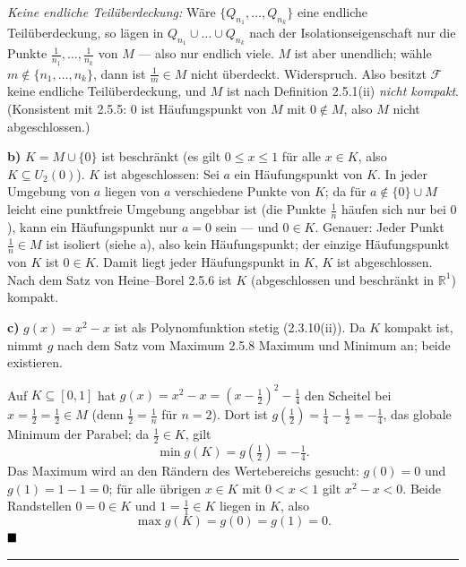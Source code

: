 \documentclass[a4paper,11pt]{article}
\providecommand{\qed}{\hfill\ensuremath{\blacksquare}}
\begin{document}
\emph{Keine endliche Teilüberdeckung:} Wäre $\{Q_{n_1},\dots,Q_{n_k}\}$ eine endliche Teilüberdeckung, so lägen in $Q_{n_1}\cup\dots\cup Q_{n_k}$ nach der Isolationseigenschaft nur die Punkte $\tfrac1{n_1},\dots,\tfrac1{n_k}$ von $M$ — also nur endlich viele. $M$ ist aber unendlich; wähle $m\notin\{n_1,\dots,n_k\}$, dann ist $\tfrac1m\in M$ nicht überdeckt. Widerspruch. Also besitzt $\mathcal F$ keine endliche Teilüberdeckung, und $M$ ist nach Definition 2.5.1(ii) \emph{nicht kompakt}. (Konsistent mit 2.5.5: $0$ ist Häufungspunkt von $M$ mit $0\notin M$, also $M$ nicht abgeschlossen.)

\textbf{b)} $K=M\cup\{0\}$ ist beschränkt (es gilt $0\le x\le 1$ für alle $x\in K$, also $K\subseteq U_2(0)$). $K$ ist abgeschlossen: Sei $a$ ein Häufungspunkt von $K$. In jeder Umgebung von $a$ liegen von $a$ verschiedene Punkte von $K$; da für $a\notin\{0\}\cup M$ leicht eine punktfreie Umgebung angebbar ist (die Punkte $\tfrac1n$ häufen sich nur bei $0$), kann ein Häufungspunkt nur $a=0$ sein — und $0\in K$. Genauer: Jeder Punkt $\tfrac1n\in M$ ist isoliert (siehe a), also kein Häufungspunkt; der einzige Häufungspunkt von $K$ ist $0\in K$. Damit liegt jeder Häufungspunkt in $K$, $K$ ist abgeschlossen. Nach dem Satz von Heine–Borel 2.5.6 ist $K$ (abgeschlossen und beschränkt in $\mathbb{R}^1$) kompakt.

\textbf{c)} $g(x)=x^2-x$ ist als Polynomfunktion stetig (2.3.10(ii)). Da $K$ kompakt ist, nimmt $g$ nach dem Satz vom Maximum 2.5.8 Maximum und Minimum an; beide existieren.

Auf $K\subseteq[0,1]$ hat $g(x)=x^2-x=\left(x-\tfrac12\right)^2-\tfrac14$ den Scheitel bei $x=\tfrac12=\tfrac1{2}\in M$ (denn $\tfrac12=\tfrac1n$ für $n=2$). Dort ist $g(\tfrac12)=\tfrac14-\tfrac12=-\tfrac14$, das globale Minimum der Parabel; da $\tfrac12\in K$, gilt
\[\min g(K)=g\!\left(\tfrac12\right)=-\tfrac14.\]
Das Maximum wird an den Rändern des Wertebereichs gesucht: $g(0)=0$ und $g(1)=1-1=0$; für alle übrigen $x\in K$ mit $0<x<1$ gilt $x^2-x<0$. Beide Randstellen $0=0\in K$ und $1=\tfrac11\in K$ liegen in $K$, also
\[\max g(K)=g(0)=g(1)=0.\]
$\qed$\par\bigskip\hrule\bigskip
\end{document}
